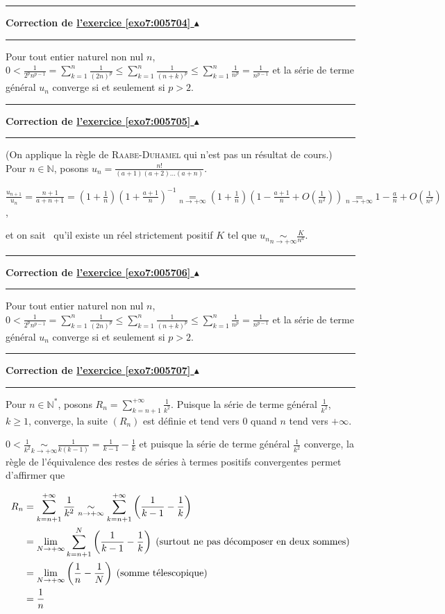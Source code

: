 \documentclass[11pt,a4paper]{article}
\newcommand{\Nn}{\mathbb{N}} \newcommand{\N}{\mathbb{N}}
\newcounter{exo}
\newcommand{\correction}[1]{\hypertarget{cor7:#1}{}\label{cor7:#1}{\bf Correction de \hyperlink{exo7:#1}{l'exercice \ref{exo7:#1} $\blacktriangle$}}\vspace{1mm}\hrule\vspace{1mm}}
\newcommand{\fincorrection}{\vspace{1mm}\hrule\vspace*{7mm}}
\begin{document}
\fincorrection
\correction{005704}
Pour tout entier naturel non nul $n$, $0<\frac{1}{2^pn^{p-1}}=\sum_{k=1}^{n}\frac{1}{(2n)^p}\leqslant\sum_{k=1}^{n}\frac{1}{(n+k)^p}\leqslant\sum_{k=1}^{n}\frac{1}{n^p}=\frac{1}{n^{p-1}}$ et la série de terme général $u_n$ converge si et seulement si $p > 2$.
\fincorrection
\correction{005705}
(On applique la règle de \textsc{Raabe}-\textsc{Duhamel} qui n'est pas un résultat de cours.) Pour $n\in\Nn$, posons $u_n=\frac{n!}{(a+1)(a+2)\ldots(a+n)}$.

\begin{center}
$\frac{u_{n+1}}{u_n}=\frac{n+1}{a+n+1}=\left(1+\frac{1}{n}\right)\left(1+\frac{a+1}{n}\right)^{-1}\underset{n\rightarrow+\infty}{=}\left(1+\frac{1}{n}\right)\left(1-\frac{a+1}{n}+O\left(\frac{1}{n^2}\right)\right)\underset{n\rightarrow+\infty}{=}1-\frac{a}{n}+O\left(\frac{1}{n^2}\right)$,
\end{center}

et \og on sait \fg~qu'il existe un réel strictement positif $K$ tel que $u_n\underset{n\rightarrow+\infty}{\sim}\frac{K}{n^a}$.  

\fincorrection
\correction{005706}
Pour tout entier naturel non nul $n$, $0<\frac{1}{2^pn^{p-1}}=\sum_{k=1}^{n}\frac{1}{(2n)^p}\leqslant\sum_{k=1}^{n}\frac{1}{(n+k)^p}\leqslant\sum_{k=1}^{n}\frac{1}{n^p}=\frac{1}{n^{p-1}}$ et la série de terme général $u_n$ converge si et seulement si $p > 2$.
\fincorrection
\correction{005707}
Pour $n\in\Nn^*$, posons $R_n=\sum_{k=n+1}^{+\infty}\frac{1}{k^2}$. Puisque la série de terme général $\frac{1}{k^2}$, $k\geqslant 1$, converge, la suite $(R_n)$ est définie et tend vers $0$ quand $n$ tend vers $+\infty$.

$0<\frac{1}{k^2}\underset{k\rightarrow+\infty}{\sim}\frac{1}{k(k-1)}=\frac{1}{k-1}-\frac{1}{k}$  et puisque la série de terme général $\frac{1}{k^2}$ converge, la règle de l'équivalence des restes de séries à termes positifs convergentes permet d'affirmer que

\begin{align*}\ensuremath
R_n&= \sum_{k=n+1}^{+\infty}\frac{1}{k^2}\underset{n\rightarrow+\infty}{\sim} \sum_{k=n+1}^{+\infty}\left(\frac{1}{k-1}-\frac{1}{k}\right)\\
 &=\lim_{N \rightarrow +\infty}\sum_{k=n+1}^{N}\left(\frac{1}{k-1}-\frac{1}{k}\right)\;(\text{surtout ne pas décomposer en deux sommes})\\
 &=\lim_{N \rightarrow +\infty}\left(\frac{1}{n}-\frac{1}{N}\right)\;(\text{somme télescopique})\\
 &=\frac{1}{n} 
\end{align*}
\end{document}
